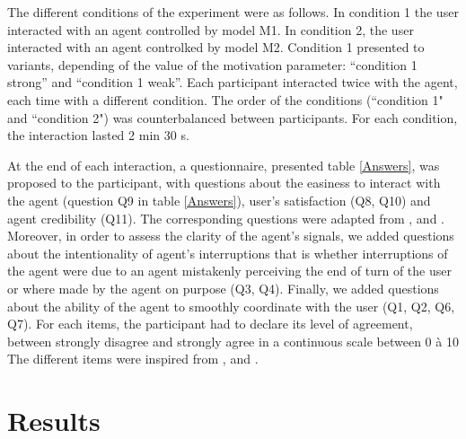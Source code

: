 The different conditions of the experiment were as follows.
In condition 1 the user interacted with an agent controlled by model M1.
In condition 2, the user interacted with an agent controlked by model M2.
Condition 1 presented to variants, depending of the value of the motivation parameter: ``condition 1 strong'' and ``condition 1 weak''. 
Each participant interacted twice with the agent, each time with a different condition.
The order of the conditions (``condition 1" and ``condition 2") was counterbalanced between participants.
For each condition, the interaction lasted 2 min 30 s. 

At the end of each interaction, a questionnaire, presented table \ref{Answers}, was proposed to the participant, with questions about the easiness to interact with the agent (question Q9 in table \ref{Answers}), user's satisfaction (Q8, Q10) and agent credibility (Q11). The corresponding questions were adapted from \cite{skantze_towards_2010}, \cite{bevacqua_effects_2014} and \cite{de_vault_toward_2015}. Moreover, in order to assess the clarity of the agent's signals, we added questions about the intentionality of agent's interruptions that is whether interruptions of the agent were due to an agent mistakenly perceiving the end of turn of the user or where made by the agent on purpose (Q3, Q4). Finally, we added questions about the ability of the agent to smoothly coordinate with the user (Q1, Q2, Q6, Q7).
For each items, the participant had to declare its level of agreement, between strongly disagree and strongly agree in a continuous scale between 0 à 10 The different items were inspired from \cite{skantze_towards_2010}, \cite{bevacqua_effects_2014} and \cite{de_vault_toward_2015}.

\section{Results}

